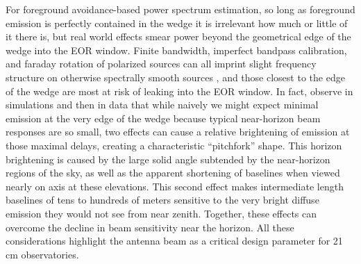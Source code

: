 \documentclass{emulateapj}
\begin{document}

For foreground avoidance-based power spectrum estimation, so long as foreground emission is perfectly contained in the wedge it is irrelevant how much or 
little of it there is, but real world effects smear power beyond the geometrical edge of the wedge into the EOR 
window. Finite bandwidth, imperfect bandpass calibration, and faraday rotation of polarized sources can all imprint slight frequency structure on otherwise spectrally smooth sources \citep{jelic2010,giannisurvey, moore2013,moore2015,asad2015,newburgh14,shaw15}, and those closest to the edge of the wedge are 
most at risk of leaking into the EOR window. In fact, 
\citet{nithya15,nithya15b} observe in simulations and then in data that while naively we might expect minimal emission 
at the very edge of the wedge because typical near-horizon beam responses are so small, 
two effects can cause a relative brightening of emission at those maximal delays, creating a characteristic ``pitchfork'' shape. This horizon 
brightening is caused by the large solid angle subtended by the near-horizon regions of the 
sky, as well as the apparent shortening of baselines when viewed nearly on axis at these elevations. 
This second effect makes intermediate length baselines of tens to hundreds of meters sensitive to the very bright diffuse 
emission they would not see from near zenith. Together, these effects can overcome the decline in beam sensitivity near the horizon. 
All these considerations highlight the antenna beam as a critical design parameter for 
21\,cm observatories.
\end{document}
